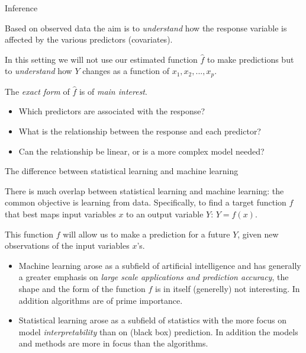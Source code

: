 \documentclass[ignorenonframetext,]{beamer}
\providecommand{\tightlist}{%
  \setlength{\itemsep}{0pt}\setlength{\parskip}{0pt}}
\begin{document}
\begin{frame}

\begin{block}{Inference}

Based on observed data the aim is to \emph{understand} how the response
variable is affected by the various predictors (covariates).

In this setting we will not use our estimated function \(\hat{f}\) to
make predictions but to \emph{understand} how \(Y\) changes as a
function of \(x_1, x_2, ..., x_p\).

The \emph{exact form} of \(\hat{f}\) is of \emph{main interest}.

\begin{itemize}
\tightlist
\item
  Which predictors are associated with the response?
\item
  What is the relationship between the response and each predictor?
\item
  Can the relationship be linear, or is a more complex model needed?
\end{itemize}

\end{block}

\end{frame}

\begin{frame}

\begin{block}{The difference between statistical learning and machine
learning}

There is much overlap between statistical learning and machine learning:
the common objective is learning from data. Specifically, to find a
target function \(f\) that best maps input variables \(x\) to an output
variable \(Y\): \(Y=f(x)\).

This function \(f\) will allow us to make a prediction for a future
\(Y\), given new observations of the input variables \(x\)'s.

\begin{itemize}
\tightlist
\item
  Machine learning arose as a subfield of artificial intelligence and
  has generally a greater emphasis on \emph{large scale applications and
  prediction accuracy}, the shape and the form of the function \(f\) is
  in itself (generelly) not interesting. In addition algorithms are of
  prime importance.
\item
  Statistical learning arose as a subfield of statistics with the more
  focus on model \emph{interpretability} than on (black box) prediction.
  In addition the models and methods are more in focus than the
  algorithms.
\end{itemize}

\end{block}

\end{frame}
\end{document}
